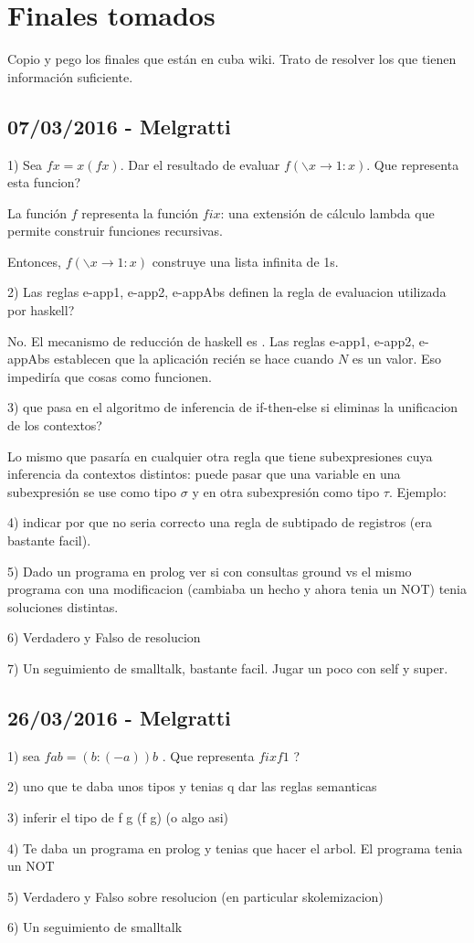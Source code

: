 \section{Finales tomados}

Copio y pego los finales que están en cuba wiki. Trato de resolver los que tienen información suficiente.

\subsection{07/03/2016 - Melgratti}

1) Sea $f x = x (f x)$. Dar el resultado de evaluar $f (\backslash x \to 1:x)$. Que representa esta funcion?

La función $f$ representa la función $fix$: una extensión de cálculo lambda que permite construir funciones recursivas.

Entonces, $f (\backslash x \to 1:x)$ construye una lista infinita de 1s.

2) Las reglas e-app1, e-app2, e-appAbs definen la regla de evaluacion utilizada por haskell?

No. El mecanismo de reducción de haskell es . Las reglas e-app1, e-app2, e-appAbs establecen que la aplicación  recién se hace cuando $N$ es un valor. Eso impediría que cosas como  funcionen.

3) que pasa en el algoritmo de inferencia de if-then-else si eliminas la unificacion de los contextos?

Lo mismo que pasaría en cualquier otra regla que tiene subexpresiones cuya inferencia da contextos distintos: puede pasar que una variable en una subexpresión se use como tipo $\sigma$ y en otra subexpresión como tipo $\tau$. Ejemplo: 

4) indicar por que no seria correcto una regla de subtipado de registros (era bastante facil).

5) Dado un programa en prolog ver si con consultas ground vs el mismo programa con una modificacion (cambiaba un hecho y ahora tenia un NOT) tenia soluciones distintas.

6) Verdadero y Falso de resolucion

7) Un seguimiento de smalltalk, bastante facil. Jugar un poco con self y super.

\subsection{26/03/2016 - Melgratti}

1) sea $f a b = (b:(-a))b$ . Que representa $fix f 1$ ?

2) uno que te daba unos tipos y tenias q dar las reglas semanticas

3) inferir el tipo de f g (f g) (o algo asi)

4) Te daba un programa en prolog y tenias que hacer el arbol. El programa tenia un NOT

5) Verdadero y Falso sobre resolucion (en particular skolemizacion)

6) Un seguimiento de smalltalk
